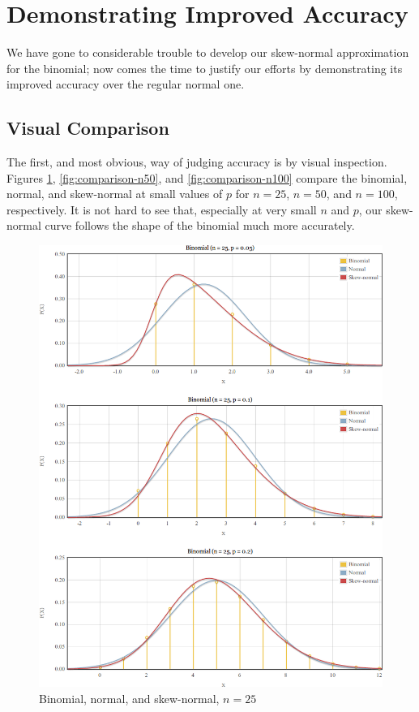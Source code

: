 \documentclass{article}
\begin{document}
\section{Demonstrating Improved Accuracy}

We have gone to considerable trouble to develop our skew-normal approximation
for the binomial; now comes the time to justify our efforts by demonstrating
its improved accuracy over the regular normal one.

\subsection{Visual Comparison}

The first, and most obvious, way of judging accuracy is by visual inspection.
Figures \ref{fig:comparison-n25}, \ref{fig:comparison-n50}, and
\ref{fig:comparison-n100} compare the binomial, normal, and skew-normal at
small values of $p$ for $n=25$, $n=50$, and $n=100$, respectively. It is not
hard to see that, especially at very small $n$ and $p$, our skew-normal curve
follows the shape of the binomial much more accurately.

\begin{figure}[h]
  \centering
  \includegraphics[width=\textwidth]{../graphs/images/comparison-n25.png}
  \caption{Binomial, normal, and skew-normal, $n=25$}
  \label{fig:comparison-n25}
\end{figure}
\end{document}
